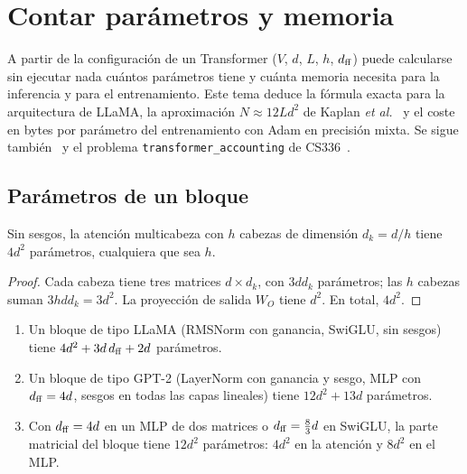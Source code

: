 \chapter{Contar parámetros y memoria}
\label{tema:5}

A partir de la configuración de un Transformer ($V$, $d$, $L$, $h$, $d_{\mathrm{ff}}$) puede calcularse sin ejecutar nada cuántos parámetros tiene y cuánta memoria necesita para la inferencia y para el entrenamiento. Este tema deduce la fórmula exacta para la arquitectura de LLaMA, la aproximación $N\approx 12Ld^{2}$ de Kaplan \emph{et al.}~\cite[§2.1]{kaplan} y el coste en bytes por parámetro del entrenamiento con Adam en precisión mixta. Se sigue también~\cite[§7.1.1 y ejercicio~7.1]{jm3} y el problema \texttt{transformer\_accounting} de CS336~\cite{cs336}.

\section{Parámetros de un bloque}

\begin{proposicion}\label{prop:cabezas}
Sin sesgos, la atención multicabeza con $h$ cabezas de dimensión $d_k=d/h$ tiene $4d^{2}$ parámetros, cualquiera que sea $h$.
\end{proposicion}

\begin{proof}
Cada cabeza tiene tres matrices $d\times d_k$, con $3dd_k$ parámetros; las $h$ cabezas suman $3hdd_k=3d^{2}$. La proyección de salida $W_O$ tiene $d^{2}$. En total, $4d^{2}$.
\end{proof}

\begin{proposicion}\label{prop:bloque}
\begin{enumerate}
  \item Un bloque de tipo LLaMA (RMSNorm con ganancia, SwiGLU, sin sesgos) tiene $4d^{2}+3d\,d_{\mathrm{ff}}+2d$ parámetros.
  \item Un bloque de tipo GPT-2 (LayerNorm con ganancia y sesgo, MLP con $d_{\mathrm{ff}}=4d$, sesgos en todas las capas lineales) tiene $12d^{2}+13d$ parámetros.
  \item Con $d_{\mathrm{ff}}=4d$ en un MLP de dos matrices o $d_{\mathrm{ff}}=\frac83 d$ en SwiGLU, la parte matricial del bloque tiene $12d^{2}$ parámetros: $4d^{2}$ en la atención y $8d^{2}$ en el MLP.
\end{enumerate}
\end{proposicion}


